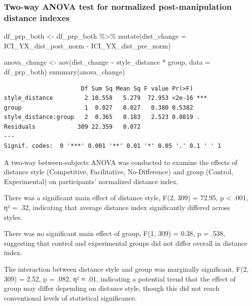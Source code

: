 \documentclass[
  letterpaper,
  DIV=11,
  numbers=noendperiod]{scrartcl}
\newenvironment{Shaded}{\begin{snugshade}}{\end{snugshade}}
\newcommand{\AttributeTok}[1]{\textcolor[rgb]{0.40,0.45,0.13}{#1}}
\newcommand{\FunctionTok}[1]{\textcolor[rgb]{0.28,0.35,0.67}{#1}}
\newcommand{\NormalTok}[1]{\textcolor[rgb]{0.00,0.23,0.31}{#1}}
\newcommand{\OtherTok}[1]{\textcolor[rgb]{0.00,0.23,0.31}{#1}}
\newcommand{\SpecialCharTok}[1]{\textcolor[rgb]{0.37,0.37,0.37}{#1}}
\begin{document}
\subsubsection{Two-way ANOVA test for normalized post-manipulation
distance
indexes}\label{two-way-anova-test-for-normalized-post-manipulation-distance-indexes}

\begin{Shaded}
\begin{Highlighting}[]
\NormalTok{df\_prp\_both }\OtherTok{\textless{}{-}}\NormalTok{ df\_prp\_both }\SpecialCharTok{\%\textgreater{}\%}
  \FunctionTok{mutate}\NormalTok{(}\AttributeTok{dist\_change =}\NormalTok{ ICI\_YX\_dist\_post\_norm }\SpecialCharTok{{-}}\NormalTok{ ICI\_YX\_dist\_pre\_norm)}

\NormalTok{anova\_change }\OtherTok{\textless{}{-}} \FunctionTok{aov}\NormalTok{(dist\_change }\SpecialCharTok{\textasciitilde{}}\NormalTok{ style\_distance }\SpecialCharTok{*}\NormalTok{ group, }\AttributeTok{data =}\NormalTok{ df\_prp\_both)}
\FunctionTok{summary}\NormalTok{(anova\_change)}
\end{Highlighting}
\end{Shaded}

\begin{verbatim}
                      Df Sum Sq Mean Sq F value Pr(>F)    
style_distance         2 10.558   5.279  72.953 <2e-16 ***
group                  1  0.027   0.027   0.380 0.5382    
style_distance:group   2  0.365   0.183   2.523 0.0819 .  
Residuals            309 22.359   0.072                   
---
Signif. codes:  0 '***' 0.001 '**' 0.01 '*' 0.05 '.' 0.1 ' ' 1
\end{verbatim}

A two-way between-subjects ANOVA was conducted to examine the effects of
distance style (Competitive, Facilitative, No-Difference) and group
(Control, Experimental) on participants' normalized distance index.

There was a significant main effect of distance style, F(2, 309) =
72.95, p \textless{} .001, η² = .32, indicating that average distance
index significantly differed across styles.

There was no significant main effect of group, F(1, 309) = 0.38, p =
.538, suggesting that control and experimental groups did not differ
overall in distance index.

The interaction between distance style and group was marginally
significant, F(2, 309) = 2.52, p = .082, η² ≈ .01, indicating a
potential trend that the effect of group may differ depending on
distance style, though this did not reach conventional levels of
statistical significance.
\end{document}

